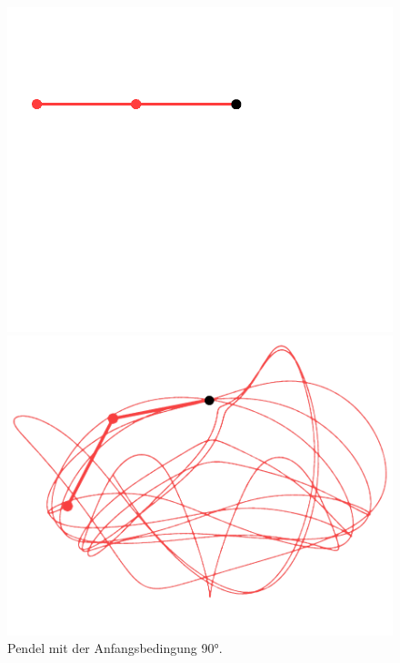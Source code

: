 \begin{figure}
    \centering
    \begin{minipage}{0.45\textwidth}
        \centering
        \includegraphics[width=\textwidth]{papers/doppelpendel/images/pendel_stand_90.png}
    \end{minipage}
    \hfill
    \begin{minipage}{0.45\textwidth}
        \centering
        \includegraphics[width=\textwidth]{papers/doppelpendel/images/pendel_spur_90.png}
    \end{minipage}
    \caption{Pendel mit der Anfangsbedingung 90°.}

\end{figure}
